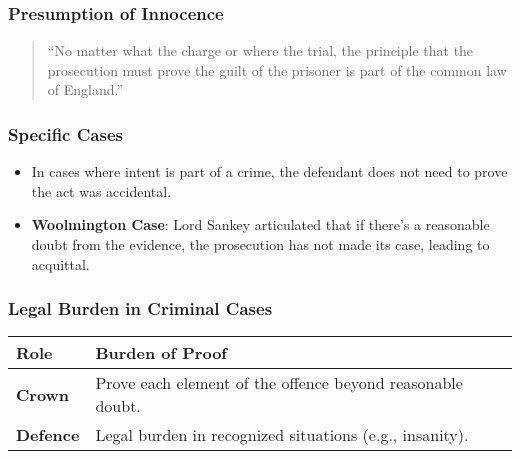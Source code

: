 \subsubsection{Presumption of Innocence}\label{presumption-of-innocence}

\begin{quote}
``No matter what the charge or where the trial, the principle that the
prosecution must prove the guilt of the prisoner is part of the common
law of England.''
\end{quote}

\subsubsection{Specific Cases}\label{specific-cases}

\begin{itemize}
\tightlist
\item
  In cases where intent is part of a crime, the defendant does not need
  to prove the act was accidental.
\item
  \textbf{Woolmington Case}: Lord Sankey articulated that if there's a
  reasonable doubt from the evidence, the prosecution has not made its
  case, leading to acquittal.
\end{itemize}

\subsubsection{Legal Burden in Criminal
Cases}\label{legal-burden-in-criminal-cases}

\begin{longtable}[]{@{}
  >{\raggedright\arraybackslash}p{}
  >{\raggedright\arraybackslash}p{}@{}}
\toprule\noalign{}
\begin{minipage}[b]{\linewidth}\raggedright
Role
\end{minipage} & \begin{minipage}[b]{\linewidth}\raggedright
Burden of Proof
\end{minipage} \\
\midrule\noalign{}
\endhead
\bottomrule\noalign{}
\endlastfoot
\textbf{Crown} & Prove each element of the offence beyond reasonable
doubt. \\
\textbf{Defence} & Legal burden in recognized situations (e.g.,
insanity). \\
\end{longtable}

